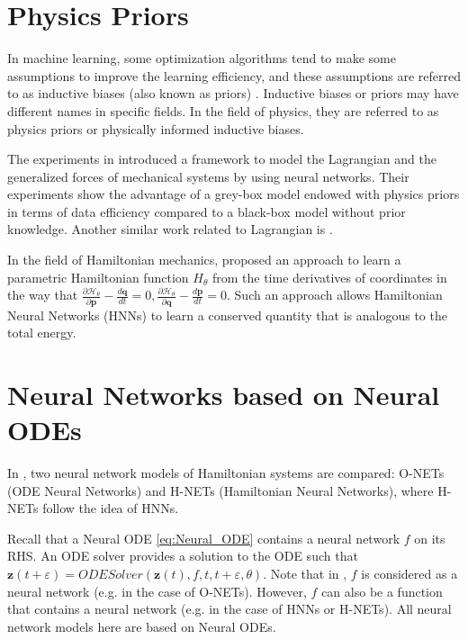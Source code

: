 \documentclass[
	parskip, 			   %
	twoside, 			   %
	DIV=14, 			   %
	BCOR=15.0mm, 		   %
	headsepline, 		   %
	open=right, 		   %
	captions=tableheading, %
	bibliography=totoc,    %
	numbers=noenddot       %
]{scrreprt}
\begin{document}
\section{Physics Priors}
In machine learning, some optimization algorithms tend to make some assumptions to improve the learning efficiency, and these assumptions are referred to as inductive biases (also known as priors) \cite{mitchell1997machine}. Inductive biases or priors may have different names in specific fields. In the field of physics, they are referred to as physics priors or physically informed inductive biases.

The experiments in \cite{gupta2019general} introduced a framework to model the Lagrangian and the generalized forces of mechanical systems by using neural networks. Their experiments show the advantage of a grey-box model endowed with physics priors in terms of data efficiency compared to a black-box model without prior knowledge. Another similar work related to Lagrangian is \cite{lutter2019deep}.

In the field of Hamiltonian mechanics, \cite{greydanus2019hamiltonian} proposed an approach to learn a parametric Hamiltonian function $H_{\theta}$ from the time derivatives of coordinates in the way that $\frac{\partial \mathcal{H}_{\theta}}{\partial \mathbf{p}} - \frac{d\mathbf{q}}{dt} = 0, \frac{\partial \mathcal{H}_{\theta}}{\partial \mathbf{q}} - \frac{d\mathbf{p}}{dt} = 0 $. Such an approach allows Hamiltonian Neural Networks (HNNs) to learn a conserved quantity that is analogous to the total energy.

\section{Neural Networks based on Neural ODEs}
In \cite{chen2019symplectic}, two neural network models of Hamiltonian systems are compared: O-NETs (ODE Neural Networks) and H-NETs (Hamiltonian Neural Networks), where H-NETs follow the idea of HNNs. 

Recall that a Neural ODE \ref{eq:Neural_ODE} contains a neural network $f$ on its RHS. An ODE solver provides a solution to the ODE such that $\mathbf{z}(t+\varepsilon) = ODESolver(\mathbf{z}(t), f, t, t+\varepsilon , \theta)$. Note that in \cite{chen2019symplectic}, $f$ is considered as a neural network (e.g. in the case of O-NETs). However, $f$ can also be a function that contains a neural network (e.g. in the case of HNNs or H-NETs). All neural network models here are based on Neural ODEs.
\end{document}
